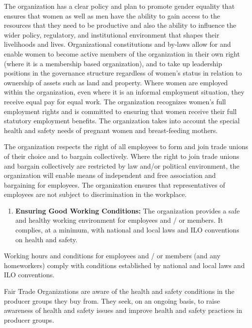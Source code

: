 \documentclass[]{book}
\providecommand{\tightlist}{%
  \setlength{\itemsep}{0pt}\setlength{\parskip}{0pt}}
\begin{document}
The organization has a clear policy and plan to promote gender equality that ensures that women as well as men have the ability to gain access to the resources that they need to be productive and also the ability to influence the wider policy, regulatory, and institutional environment that shapes their livelihoods and lives. Organizational constitutions and by-laws allow for and enable women to become active members of the organization in their own right (where it is a membership based organization), and to take up leadership positions in the governance structure regardless of women's status in relation to ownership of assets such as land and property. Where women are employed within the organization, even where it is an informal employment situation, they receive equal pay for equal work. The organization recognizes women's full employment rights and is committed to ensuring that women receive their full statutory employment benefits. The organization takes into account the special health and safety needs of pregnant women and breast-feeding mothers.

The organization respects the right of all employees to form and join trade unions of their choice and to bargain collectively. Where the right to join trade unions and bargain collectively are restricted by law and/or political environment, the organization will enable means of independent and free association and bargaining for employees. The organization ensures that representatives of employees are not subject to discrimination in the workplace.

\begin{enumerate}
\def\labelenumi{\arabic{enumi}.}
\setcounter{enumi}{6}
\tightlist
\item
  \textbf{Ensuring Good Working Conditions:}
  The organization provides a safe and healthy working environment for employees and / or members. It complies, at a minimum, with national and local laws and ILO conventions on health and safety.
\end{enumerate}

Working hours and conditions for employees and / or members (and any homeworkers) comply with conditions established by national and local laws and ILO conventions.

Fair Trade Organizations are aware of the health and safety conditions in the producer groups they buy from. They seek, on an ongoing basis, to raise awareness of health and safety issues and improve health and safety practices in producer groups.
\end{document}
